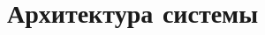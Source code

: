 \documentclass[../nirs.tex]{subfiles}
\begin{document}
  \chapter{Архитектура системы}
  
\end{document}

